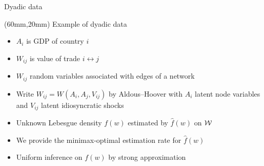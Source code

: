\documentclass{beamer}
\begin{document}
\begin{frame}{Dyadic data}

  \begin{textblock*}{68mm}(60mm,20mm)
    \vspace*{1mm}
    Example of dyadic data
    \vspace*{-1mm}
    \begin{itemize}
      \item $A_i$ is GDP of country $i$
      \item $W_{i j}$ is value of trade $i \leftrightarrow j$
    \end{itemize}
  \end{textblock*}

  \begin{figure}
    \centering
    \hspace*{-60mm}
    \begin{subfigure}{0.54\textwidth}
      \centering
    \end{subfigure}
  \end{figure}

  \begin{itemize}

    \item
      $W_{i j}$ random variables associated with edges of a network

    \item Write $W_{i j} = W(A_i, A_j, V_{i j})$
      by Aldous--Hoover
      with $A_i$ latent node variables
      and $V_{i j}$ latent idiosyncratic shocks

    \item
      Unknown Lebesgue density $f(w)$ estimated by $\hat f(w)$
      on $\mathcal{W}$

    \item
      We provide the \alert{minimax-optimal estimation} rate for $\hat f(w)$

    \item
      \alert{Uniform inference} on $f(w)$
      by strong approximation

  \end{itemize}

\end{frame}
\end{document}
